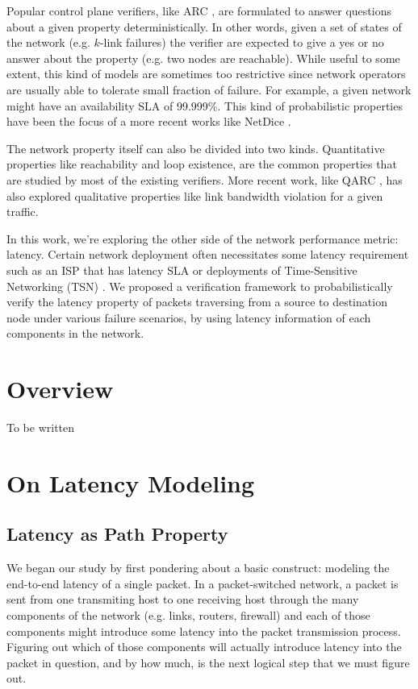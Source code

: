 \documentclass[10pt,sigconf,letterpaper,anonymous,nonacm]{acmart}
\begin{document}
Popular control plane verifiers, like ARC \cite{gember2016fast}, are formulated to answer 
questions about a given property deterministically. 
In other words, given a set of states of the network (e.g. $k$-link failures) the verifier are 
expected to give a yes or no answer about the property (e.g. two nodes are reachable).
While useful to some extent, this kind of models are sometimes too restrictive since network 
operators are usually able to tolerate small fraction of failure. 
For example, a given network might have an availability SLA of 99.999\%. 
This kind of probabilistic properties have been the focus of a more recent works like NetDice 
\cite{steffen2020probabilistic}.

The network property itself can also be divided into two kinds. 
Quantitative properties like reachability and loop existence, are the common properties that are 
studied by most of the existing verifiers. 
More recent work, like QARC \cite{subramanian2020detecting}, has also explored qualitative 
properties like link bandwidth violation for a given traffic.

In this work, we're exploring the other side of the network performance metric: latency. 
Certain network deployment often necessitates some latency requirement such as an ISP that has 
latency SLA \cite{Verizon} or deployments of Time-Sensitive Networking (TSN) \cite{TSN}.
We proposed a verification framework to probabilistically verify the latency property of packets 
traversing from a source to destination node under various failure scenarios, by using latency 
information of each components in the network.

\section{Overview}
To be written


\section{On Latency Modeling}
\subsection{Latency as Path Property} 
We began our study by first pondering about a basic construct: modeling the end-to-end latency of 
a single packet.
In a packet-switched network, a packet is sent from one transmiting host to one receiving host 
through the many components of the network (e.g. links, routers, firewall) and each of those 
components might introduce some latency into the packet transmission process.
Figuring out which of those components will actually introduce latency into the packet in question, 
and by how much, is the next logical step that we must figure out.
\end{document}

